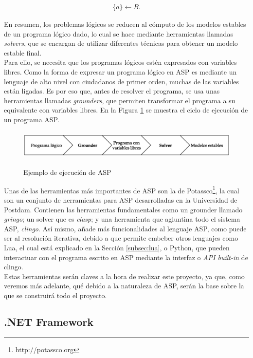 \begin{align}
	\{a\} \leftarrow B.
\end{align}

En resumen, los problemas lógicos se reducen al cómputo de los modelos estables de un programa lógico dado, lo cual se hace mediante herramientas llamadas \textit{solvers}, que se encargan de utilizar diferentes técnicas para obtener un modelo estable final. \\

Para ello, se necesita que los programas lógicos estén expresados con variables libres. Como la forma de expresar un programa lógico en ASP es mediante un lenguaje de alto nivel con ciudadanos de primer orden, muchas de las variables están ligadas. Es por eso que, antes de resolver el programa, se usa unas herramientas llamadas \textit{grounders}, que permiten transformar el programa a su equivalente con variables libres. En la Figura \ref{fig:asp} se muestra el ciclo de ejecución de un programa ASP. \\

\begin{figure}[h]
	\centering
	\includegraphics[height=4em]{images/ASP}
	\label{fig:asp}
	\caption{Ejemplo de ejecución de ASP}
\end{figure}

Unas de las herramientas más importantes de ASP son la de Potassco\footnote{http://potassco.org}, la cual son un conjunto de herramientas para ASP desarrolladas en la Universidad de Postdam. Contienen las herramientas fundamentales como un grounder llamado \textit{gringo}; un solver que es \textit{clasp}; y una herramienta que agluntina todo el sistema ASP, \textit{clingo}. Así mismo, añade más funcionalidades al lenguaje ASP, como puede ser al resolución iterativa, debido a que permite embeber otros lenguajes como Lua, el cual está explicado en la Sección \ref{subsec:lua}, o Python, que pueden interactuar con el programa escrito en ASP mediante la interfaz o \textit{API built-in} de clingo. \\

Estas herramientas serán claves a la hora de realizar este proyecto, ya que, como veremos más adelante, qué debido a la naturaleza de ASP, serán la base sobre la que se construirá todo el proyecto.

\subsection{.NET Framework}

